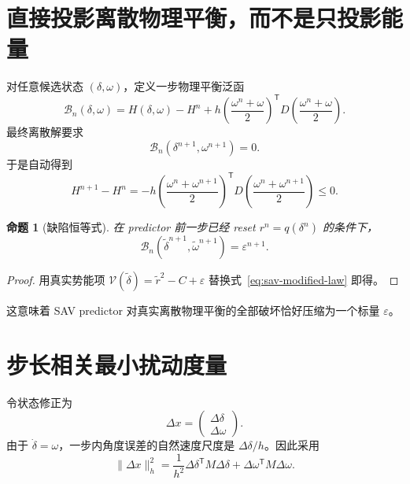 \documentclass[UTF8,11pt,a4paper]{ctexart}
\newtheorem{proposition}[theorem]{命题}
\theoremstyle{definition}
\theoremstyle{remark}
\newcommand{\T}{\mathsf{T}}
\newcommand{\V}{\mathcal V}
\newcommand{\B}{\mathcal B}
\newcommand{\wt}{\widetilde}
\begin{document}
\section{直接投影离散物理平衡，而不是只投影能量}

对任意候选状态 \((\delta,\omega)\)，定义一步物理平衡泛函
\begin{equation}
 \boxed{
 \B_n(\delta,\omega)
 =
 H(\delta,\omega)-H^n
 +
 h\left(
 \frac{\omega^n+\omega}{2}
 \right)^\T
 D
 \left(
 \frac{\omega^n+\omega}{2}
 \right).}
 \label{eq:balance-functional}
\end{equation}
最终离散解要求
\begin{equation}
 \B_n(\delta^{n+1},\omega^{n+1})=0.
 \label{eq:balance-target}
\end{equation}
于是自动得到
\begin{equation}
 \boxed{
 H^{n+1}-H^n
 =
 -h
 \left(
 \frac{\omega^n+\omega^{n+1}}2
 \right)^\T
 D
 \left(
 \frac{\omega^n+\omega^{n+1}}2
 \right)\le0.}
 \label{eq:exact-discrete-balance}
\end{equation}

\begin{proposition}[缺陷恒等式]
在 predictor 前一步已经 reset \(r^n=q(\delta^n)\) 的条件下，
\begin{equation}
 \boxed{
 \B_n(\wt\delta^{n+1},\wt\omega^{n+1})
 =
 \varepsilon^{n+1}.}
 \label{eq:defect-identity}
\end{equation}
\end{proposition}

\begin{proof}
用真实势能项
\(
 \V(\wt\delta)=\wt r^2-C+\varepsilon
\)
替换式~\eqref{eq:sav-modified-law} 即得。
\end{proof}

这意味着 SAV predictor 对真实离散物理平衡的全部破坏恰好压缩为一个标量
\(\varepsilon\)。

\section{步长相关最小扰动度量}

令状态修正为
\[
 \Delta x=
 \begin{pmatrix}
  \Delta\delta\\
  \Delta\omega
 \end{pmatrix}.
\]
由于 \(\dot\delta=\omega\)，一步内角度误差的自然速度尺度是
\(\Delta\delta/h\)。因此采用
\begin{equation}
 \boxed{
 \|\Delta x\|_h^2
 =
 \frac1{h^2}\Delta\delta^\T M\Delta\delta
 +
 \Delta\omega^\T M\Delta\omega .}
 \label{eq:h-metric}
\end{equation}
\end{document}

